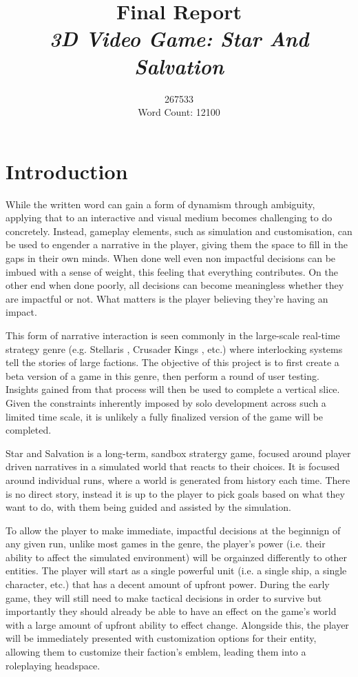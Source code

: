 \documentclass{report}
\begin{document}
\title{
Final Report \\ 
\textit{3D Video Game: Star And Salvation} }
\author{267533\\
\large Word Count: 12100}

\maketitle

\tableofcontents

\chapter{Introduction}
While the written word can gain a form of dynamism through ambiguity, applying that to an interactive and visual medium becomes challenging to do concretely. Instead, gameplay elements, such as simulation and customisation, can be used to engender a narrative in the player, giving them the space to fill in the gaps in their own minds. When done well even non impactful decisions can be imbued with a sense of weight, this feeling that everything contributes. On the other end when done poorly, all decisions can become meaningless whether they are impactful or not. What matters is the player believing they're having an impact. 

This form of narrative interaction is seen commonly in the large-scale real-time strategy genre (e.g. Stellaris \cite{stellaris}, Crusader Kings \cite{crusaderkings}, etc.) where interlocking systems tell the stories of large factions. The objective of this project is to first create a beta version of a game in this genre, then perform a round of user testing. Insights gained from that process will then be used to complete a vertical slice. Given the constraints inherently imposed by solo development across such a limited time scale, it is unlikely a fully finalized version of the game will be completed.

Star and Salvation is a long-term, sandbox stratergy game, focused around player driven narratives in a simulated world that reacts to their choices. It is focused around individual runs, where a world is generated from history each time. There is no direct story, instead it is up to the player to pick goals based on what they want to do, with them being guided and assisted by the simulation.

To allow the player to make immediate, impactful decisions at the beginnign of any given run, unlike most games in the genre, the player's power (i.e. their ability to affect the simulated environment) will be orgainzed differently to other entities. The player will start as a single powerful unit (i.e. a single ship, a single character, etc.) that has a decent amount of upfront power. During the early game, they will still need to make tactical decisions in order to survive but importantly they should already be able to have an effect on the game's world with a large amount of upfront ability to effect change. Alongside this, the player will be immediately presented with customization options for their entity, allowing them to customize their faction's emblem, leading them into a roleplaying headspace.
\end{document}
